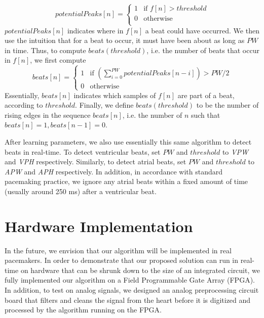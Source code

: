 \documentclass[conference]{IEEEtran}
\newcommand{\APW}{\textit{APW}}
\newcommand{\VPW}{\textit{VPW}}
\newcommand{\APH}{\textit{APH}}
\newcommand{\VPH}{\textit{VPH}}
\begin{document}
\begin{equation*}
	potentialPeaks[n]=\left\{ 
		\begin{array}{lr}
			1 & \text{if } f[n] > threshold \\
			0 & \text{otherwise}\\
		\end{array}
		\right.
\end{equation*}
$potentialPeaks[n]$ indicates where in $f[n]$ a beat could
have occurred. We then use the intuition that for a beat
to occur, it must have been about as long as $PW$ in time.
Thus, to compute $beats(threshold)$, i.e. the number of
beats that occur in $f[n]$, we first compute
\begin{equation*}
	beats[n]=\left\{ 
		\begin{array}{lc}
			1 & \text{if } \left(\sum_{i=0}^{PW} potentialPeaks[n-i] \right) > PW/2 \\
			0 & \text{otherwise}
		\end{array}
		\right.
\end{equation*}
Essentially, $beats[n]$ indicates which samples of $f[n]$ are part of a beat, according to $threshold$.
Finally, we define $beats(threshold)$ to be the number of rising edges in the sequence $beats[n]$, 
i.e. the number of $n$ such that $beats[n] = 1, beats[n-1] = 0$. %

After learning parameters, we also use essentially this same algorithm to detect beats in real-time.
To detect ventricular beats, set $PW$ and $threshold$ to \VPW{} and \VPH{} respectively.
Similarly, to detect atrial beats, set $PW$ and $threshold$ to \APW{} and \APH{} respectively.
In addition, in accordance with standard pacemaking practice, we ignore any atrial beats within a fixed amount of time (usually around 250 ms) after
a ventricular beat.

\section{Hardware Implementation}
In the future, we envision that our algorithm will be
implemented in real pacemakers. In order to
demonstrate that our proposed solution can run in
real-time on hardware that can be shrunk down to
the size of an integrated circuit, we fully implemented
our algorithm on a Field Programmable Gate Array
(FPGA).
In addition, to test on analog signals, we
designed an analog preprocessing circuit board that filters and
cleans the signal from the heart before it is digitized and processed
by the algorithm running on the FPGA.
\end{document}
